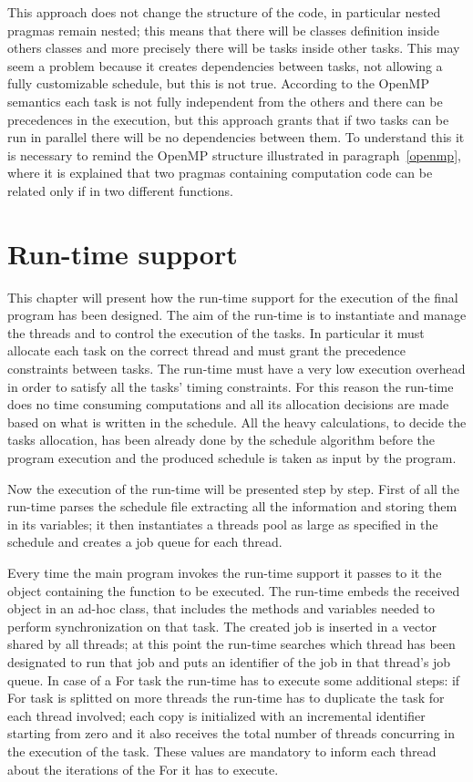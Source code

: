 \documentclass[a4paper,11pt,oneside]{book}
\begin{document}
This approach does not change the structure of the code, in particular nested pragmas remain nested; this means that there will be classes definition inside others classes and more precisely there will be tasks inside other tasks. This may seem a problem because it creates dependencies between tasks, not allowing a fully customizable schedule, but this is not true. According to the OpenMP semantics each task is not fully independent from the others and there can be precedences in the execution, but this approach grants that if two tasks can be run in parallel there will be no dependencies between them. To understand this it is necessary to remind the OpenMP structure illustrated in paragraph~\ref{openmp}, where it is explained that two pragmas containing computation code can be related only if in two different functions. 


\section{Run-time support}

This chapter will present how the run-time support for the execution of the final program has been designed. The aim of the run-time is to instantiate and manage the threads and to control the execution of the tasks. In particular it must allocate each task on the correct thread and must grant the precedence constraints between tasks. The run-time must have a very low execution overhead in order to satisfy all the tasks' timing constraints. For this reason the run-time does no time consuming computations and all its allocation decisions are made based on what is written in the schedule. All the heavy calculations, to decide the tasks allocation, has been already done by the schedule algorithm before the program execution and the produced schedule is taken as input by the program. 

Now the execution of the run-time will be presented step by step. First of all the run-time parses the schedule file extracting all the information and storing them in its variables; it then instantiates a threads pool as large as specified in the schedule and creates a job queue for each thread. 

Every time the main program invokes the run-time support it passes to it the object containing the function to be executed. The run-time embeds the received object in an ad-hoc class, that includes the methods and variables needed to perform synchronization on that task. The created job is inserted in a vector shared by all threads; at this point the run-time searches which thread has been designated to run that job and puts an identifier of the job in that thread’s job queue. In case of a For task the run-time has to execute some additional steps: if For task is splitted on more threads the run-time has to duplicate the task for each thread involved; each copy is initialized with an incremental identifier starting from zero and it also receives the total number of threads concurring in the execution of the task. These values are mandatory to inform each thread about the iterations of the For it has to execute. 
\end{document}
